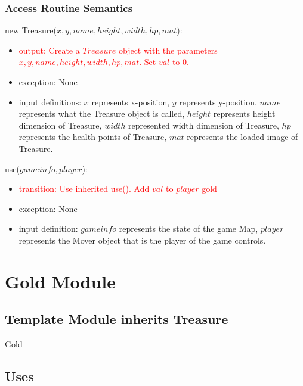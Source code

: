 \documentclass[12pt]{article}
\newcommand{\m}[1]{\mbox{#1}}
\begin{document}
\subsubsection*{Access Routine Semantics}

new Treasure($x, y, name, height, width, hp, mat$):
\begin{itemize}
    \item \textcolor{red}{output: Create a $Treasure$ object with the parameters $x, y, name, height, width, hp, mat$. Set $val$ to 0.}
    \item exception: None
    \item input definitions: $x$ represents x-position, $y$ represents y-position, $name$ represents what the Treasure object is called, $height$ represents height dimension of Treasure, $width$ represented width dimension of Treasure, $hp$ represents the health points of Treasure, $mat$ represents the loaded image of Treasure.
\end{itemize}

\noindent use($gameinfo, player$):
\begin{itemize}
    \item \textcolor{red}{transition: Use inherited use(). Add $val$ to $player$ gold}
    \item exception: None
    \item input definition: $gameinfo$ represents the state of the game Map, $player$ represents the Mover object that is the player of the game controls.
\end{itemize}

\newpage

\section*{Gold Module}

\subsection*{Template Module inherits Treasure}

Gold

\subsection*{Uses}
\end{document}
